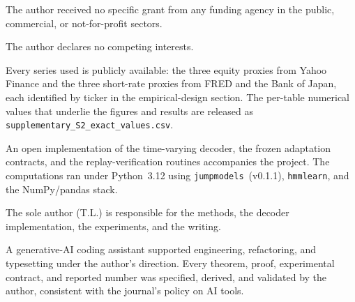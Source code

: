\ifanon\else
\backmatter

The author received no specific grant from any funding agency in the public,
commercial, or not-for-profit sectors.

The author declares no competing interests.

Every series used is publicly available: the three equity proxies from Yahoo
Finance and the three short-rate proxies from FRED and the Bank of Japan, each
identified by ticker in the empirical-design section. The per-table numerical
values that underlie the figures and results are released as
\texttt{supplementary\_S2\_exact\_values.csv}.

An open implementation of the time-varying decoder, the frozen adaptation
contracts, and the replay-verification routines accompanies the project. The
computations ran under Python~3.12 using \texttt{jumpmodels}~(v0.1.1),
\texttt{hmmlearn}, and the NumPy/pandas stack.

The sole author (T.L.) is responsible for the methods, the decoder
implementation, the experiments, and the writing.

A generative-AI coding assistant supported engineering, refactoring, and
typesetting under the author's direction. Every theorem, proof, experimental
contract, and reported number was specified, derived, and validated by the
author, consistent with the journal's policy on AI tools.
\fi

